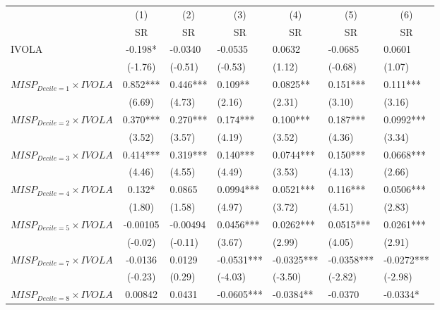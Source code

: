 \begin{tabular}{lllllll}
\toprule
        & \multicolumn{1}{c}{(1)} & \multicolumn{1}{c}{(2)} & \multicolumn{1}{c}{(3)} & \multicolumn{1}{c}{(4)} & \multicolumn{1}{c}{(5)} & \multicolumn{1}{c}{(6)} \\
        & \multicolumn{1}{c}{SR} & \multicolumn{1}{c}{SR} & \multicolumn{1}{c}{SR} & \multicolumn{1}{c}{SR} & \multicolumn{1}{c}{SR} & \multicolumn{1}{c}{SR} \\
\midrule
IVOLA   & \multicolumn{1}{c}{-0.198*} & -0.0340 & -0.0535 & 0.0632  & -0.0685 & 0.0601 \\
        & \multicolumn{1}{c}{(-1.76)} & (-0.51) & (-0.53) & (1.12)  & (-0.68) & (1.07) \\
$MISP_{Decile = 1} \times IVOLA$ & \multicolumn{1}{c}{0.852***} & 0.446*** & 0.109** & 0.0825** & 0.151*** & 0.111*** \\
        & \multicolumn{1}{c}{(6.69)} & (4.73)  & (2.16)  & (2.31)  & (3.10)  & (3.16) \\
$MISP_{Decile = 2} \times IVOLA$ & \multicolumn{1}{c}{0.370***} & 0.270*** & 0.174*** & 0.100*** & 0.187*** & 0.0992*** \\
        & \multicolumn{1}{c}{(3.52)} & (3.57)  & (4.19)  & (3.52)  & (4.36)  & (3.34) \\
$MISP_{Decile = 3} \times IVOLA$ & \multicolumn{1}{c}{0.414***} & 0.319*** & 0.140*** & 0.0744*** & 0.150*** & 0.0668*** \\
        & \multicolumn{1}{c}{(4.46)} & (4.55)  & (4.49)  & (3.53)  & (4.13)  & (2.66) \\
$MISP_{Decile = 4} \times IVOLA$ & \multicolumn{1}{c}{0.132*} & 0.0865  & 0.0994*** & 0.0521*** & 0.116*** & 0.0506*** \\
        & \multicolumn{1}{c}{(1.80)} & (1.58)  & (4.97)  & (3.72)  & (4.51)  & (2.83) \\
$MISP_{Decile = 5} \times IVOLA$ & \multicolumn{1}{c}{-0.00105} & -0.00494 & 0.0456*** & 0.0262*** & 0.0515*** & 0.0261*** \\
        & \multicolumn{1}{c}{(-0.02)} & (-0.11) & (3.67)  & (2.99)  & (4.05)  & (2.91) \\
$MISP_{Decile = 7} \times IVOLA$ & \multicolumn{1}{c}{-0.0136} & 0.0129  & -0.0531*** & -0.0325*** & -0.0358*** & -0.0272*** \\
        & \multicolumn{1}{c}{(-0.23)} & (0.29)  & (-4.03) & (-3.50) & (-2.82) & (-2.98) \\
$MISP_{Decile = 8} \times IVOLA$ & \multicolumn{1}{c}{0.00842} & 0.0431  & -0.0605*** & -0.0384** & -0.0370 & -0.0334* \\

\end{tabular}

